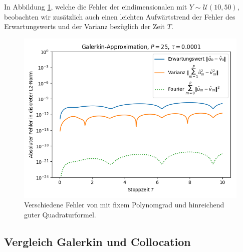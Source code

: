 \newline
In Abbildung \ref{fig:galerkin_bystoptime_trial3}, welche die Fehler der eindimensionalen  mit $Y\sim\mathcal{U}(10,50)$, beobachten wir zusätzlich auch einen leichten Aufwärtstrend der Fehler des Erwartungswerts und der Varianz bezüglich der Zeit $T$.
\begin{figure}[!htb]
\centering
\includegraphics[width=0.75\linewidth]{Figures/galerkin_bystoptime_trial3_fixeddegree25_big.png}
\caption{Verschiedene Fehler von  mit fixem Polynomgrad und hinreichend guter Quadraturformel.}
\label{fig:galerkin_bystoptime_trial3}
\end{figure}

\subsection{Vergleich Galerkin und Collocation}
